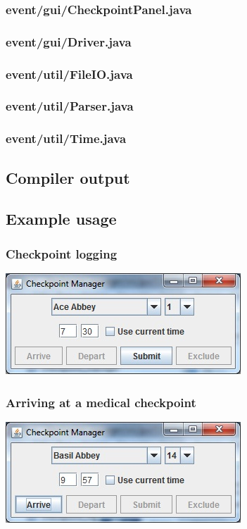 \documentclass[a4paper, twoside]{article}
\begin{document}
\subsubsection{event/gui/CheckpointPanel.java}

\subsubsection{event/gui/Driver.java}

\subsubsection{event/util/FileIO.java}

\subsubsection{event/util/Parser.java}

\subsubsection{event/util/Time.java}

\subsection{Compiler output}
\lstset{tabsize=2, breaklines=true, breakatwhitespace=false, basicstyle=\ttfamily}

\lstset{tabsize=2, breaklines=true, breakatwhitespace=true, basicstyle=\ttfamily}
\subsection{Example usage}
\subsubsection{Checkpoint logging}
\includegraphics{screenshot1.jpg}
\subsubsection{Arriving at a medical checkpoint}
\includegraphics{screenshot2.jpg}
\end{document}
